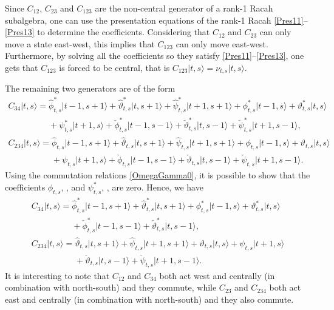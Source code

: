 \documentclass[10pt,a4paper]{amsart}
\numberwithin{equation}{section}
\begin{document}
Since $C_{12}$, $C_{23}$ and $C_{123}$ are the non-central generator of a rank-1 Racah subalgebra, one can use the presentation equations of the rank-1 Racah \eqref{Pres11}--\eqref{Pres13} to determine the coefficients. Considering that $C_{12}$ and $C_{23}$ can only move a state east-west, this implies that $C_{123}$ can only move east-west. Furthermore, by solving all the coefficients so they satisfy \eqref{Pres11}--\eqref{Pres13}, one gets that $C_{123}$ is forced to be central, that is
$
C_{123}\vert t,s\rangle =\nu_{t,s}\vert t,s\rangle$.

The remaining two generators are of the form
\begin{gather*}
C_{34}\vert t,s\rangle =\hat{\phi}^*_{t,s}\vert t-1,s+1\rangle+\hat{\vartheta}^*_{t,s}\vert t,s+1\rangle+\hat{\psi}^*_{t,s}\vert t+1,s+1\rangle+\phi^*_{t,s}\vert t-1,s\rangle+\vartheta^*_{t,s}\vert t,s\rangle\\
\phantom{C_{34}\vert t,s\rangle =}{}+\psi^*_{t,s}\vert t+1,s\rangle
+\check{\phi}^*_{t,s}\vert t-1,s-1\rangle+\check{\vartheta}^*_{t,s}\vert t,s-1\rangle+\check{\psi}^*_{t,s}\vert t+1,s-1\rangle,\\
C_{234}\vert t,s\rangle =\hat{\phi}_{t,s}\vert t-1,s+1\rangle+\hat{\vartheta}_{t,s}\vert t,s+1\rangle+\hat{\psi}_{t,s}\vert t+1,s+1\rangle+\phi_{t,s}\vert t-1,s\rangle+\vartheta_{t,s}\vert t,s\rangle\\
\phantom{C_{234}\vert t,s\rangle =}{}+\psi_{t,s}\vert t+1,s\rangle
+\check{\phi}_{t,s}\vert t-1,s-1\rangle+\check{\vartheta}_{t,s}\vert t,s-1\rangle+\check{\psi}_{t,s}\vert t+1,s-1\rangle.
\end{gather*}
Using the commutation relations \eqref{OmegaGamma0}, it is possible to show that the coefficients $\phi_{t,s}$, ,  and $\psi^*_{t,s}$, ,  are zero. Hence, we have
\begin{gather*}
C_{34}\vert t,s\rangle =\hat{\phi}^*_{t,s}\vert t-1,s+1\rangle+\hat{\vartheta}^*_{t,s}\vert t,s+1\rangle
+\phi^*_{t,s}\vert t-1,s\rangle+\vartheta^*_{t,s}\vert t,s\rangle\\
\phantom{C_{34}\vert t,s\rangle =}{}+\check{\phi}^*_{t,s}\vert t-1,s-1\rangle+\check{\vartheta}^*_{t,s}\vert t,s-1\rangle,\\
C_{234}\vert t,s\rangle =\hat{\vartheta}_{t,s}\vert t,s+1\rangle+\hat{\psi}_{t,s}\vert t+1,s+1\rangle
+\vartheta_{t,s}\vert t,s\rangle+\psi_{t,s}\vert t+1,s\rangle\\
\phantom{C_{234}\vert t,s\rangle =}{}+\check{\vartheta}_{t,s}\vert t,s-1\rangle+\check{\psi}_{t,s}\vert t+1,s-1\rangle.
\end{gather*}
It is interesting to note that $C_{12}$ and $C_{34}$ both act west and centrally (in combination with north-south) and they commute, while $C_{23}$ and $C_{234}$ both act east and centrally (in combination with north-south) and they also commute.
\end{document}
